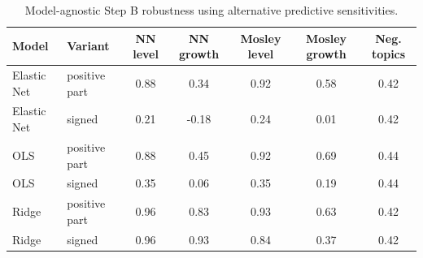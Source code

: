 \begin{table}[!htb]
\centering
\caption{Model-agnostic Step B robustness using alternative predictive sensitivities.}
\label{tab:stepb_model_agnostic_elasticities}
\small
\setlength{\tabcolsep}{3pt}
\begin{tabular}{l l c c c c c}
\toprule
Model & Variant & NN level & NN growth & Mosley level & Mosley growth & Neg. topics \\
\midrule
Elastic Net & positive part & 0.88 & 0.34 & 0.92 & 0.58 & 0.42 \\
Elastic Net & signed & 0.21 & -0.18 & 0.24 & 0.01 & 0.42 \\
OLS & positive part & 0.88 & 0.45 & 0.92 & 0.69 & 0.44 \\
OLS & signed & 0.35 & 0.06 & 0.35 & 0.19 & 0.44 \\
Ridge & positive part & 0.96 & 0.83 & 0.93 & 0.63 & 0.42 \\
Ridge & signed & 0.96 & 0.93 & 0.84 & 0.37 & 0.42 \\
\bottomrule
\end{tabular}
\end{table}

